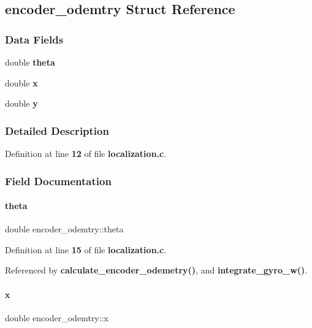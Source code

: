 \subsection{encoder\+\_\+odemtry Struct Reference}
\label{a00203}
\subsubsection*{Data Fields}
\begin{DoxyCompactItemize}
\item 
double \textbf{ theta}
\item 
double \textbf{ x}
\item 
double \textbf{ y}
\end{DoxyCompactItemize}


\subsubsection{Detailed Description}


Definition at line \textbf{ 12} of file \textbf{ localization.\+c}.



\subsubsection{Field Documentation}
\mbox{\label{a00203_af1a1e2a2a7a2f89138a8c261a3b82898}} 
\paragraph{theta}
{\footnotesize\ttfamily double encoder\+\_\+odemtry\+::theta}



Definition at line \textbf{ 15} of file \textbf{ localization.\+c}.



Referenced by \textbf{ calculate\+\_\+encoder\+\_\+odemetry()}, and \textbf{ integrate\+\_\+gyro\+\_\+w()}.

\mbox{\label{a00203_a9a803978381f9b89a031d520a627cbcf}} 
\paragraph{x}
{\footnotesize\ttfamily double encoder\+\_\+odemtry\+::x}



